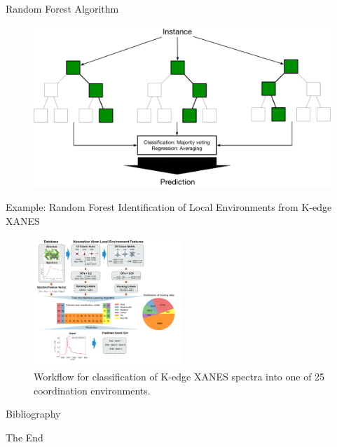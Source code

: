 \documentclass{beamer}
\begin{document}
\begin{frame}{Random Forest Algorithm}
\begin{figure}
    \centering
    \includegraphics[width=\textwidth]{figures/randomforestalgo.pdf}
\end{figure}
\end{frame}



\begin{frame}{Example: Random Forest Identification of Local Environments from K-edge XANES}
\begin{figure}
    \centering
    \includegraphics[width=0.5\textwidth]{figures/randomforestxanes.pdf}
    \caption{Workflow for classification of K-edge XANES spectra into one of 25 coordination environments.\cite{zhengRandomForestModels2019}}
\end{figure}
\end{frame}


\begin{frame}{Bibliography}
    
    
\end{frame}




\begin{frame}
    \Huge{\centerline{The End}}
\end{frame}
\end{document}
